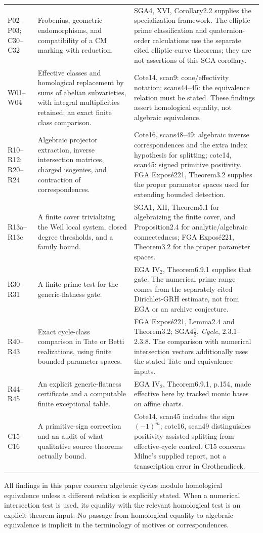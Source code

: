 \begin{longtable}{@{}p{}p{}p{}@{}}
P02--P03; C30--C32 & Frobenius, geometric endomorphisms, and compatibility of a CM marking with reduction. & SGA4, XVI, Corollary2.2 supplies the specialization framework. The elliptic prime classification and quaternion-order calculations use the separate cited elliptic-curve theorems; they are not assertions of this SGA corollary.\\[4pt]
W01--W04 & Effective classes and homological replacement by sums of abelian subvarieties, with integral multiplicities retained; an exact finite class comparison. & Cote14, scan9: cone/effectivity notation; scans44--45: the equivalence relation must be stated. These findings assert homological equality, not algebraic equivalence.\\[4pt]
R10--R12; R20--R24 & Algebraic projector extraction, inverse intersection matrices, charged isogenies, and contraction of correspondences. & Cote16, scans48--49: algebraic inverse correspondences and the extra index hypothesis for splitting; cote14, scan45: signed primitive positivity. FGA Expos\'e221, Theorem3.2 supplies the proper parameter spaces used for extending bounded detection.\\[4pt]
R13a--R13c & A finite cover trivializing the Weil local system, closed degree thresholds, and a family bound. & SGA1, XII, Theorem5.1 for algebraizing the finite cover, and Proposition2.4 for analytic/algebraic connectedness; FGA Expos\'e221, Theorem3.2 for the proper parameter spaces.\\[4pt]
R30--R31 & A finite-prime test for the generic-flatness gate. & EGA IV$_2$, Theorem6.9.1 supplies that gate. The numerical prime range comes from the separately cited Dirichlet-GRH estimate, not from EGA or an archive conjecture.\\[4pt]
R40--R43 & Exact cycle-class comparison in Tate or Betti realizations, using finite bounded parameter spaces. & FGA Expos\'e221, Lemma2.4 and Theorem3.2; SGA$4\frac12$, \emph{Cycle}, 2.3.1--2.3.8. The comparison with numerical intersection vectors additionally uses the stated Tate and equivalence inputs.\\[4pt]
R44--R45 & An explicit generic-flatness certificate and a computable finite exceptional table. & EGA IV$_2$, Theorem6.9.1, p.154, made effective here by tracked monic bases on affine charts.\\[4pt]
C15--C16 & A primitive-sign correction and an audit of what qualitative source theorems actually bound. & Cote14, scan45 includes the sign $(-1)^m$; cote16, scan49 distinguishes positivity-assisted splitting from effective-cycle control. C15 concerns Milne's supplied report, not a transcription error in Grothendieck.\\
\bottomrule
\end{longtable}
\normalsize

All findings in this paper concern algebraic cycles modulo homological
equivalence unless a different relation is explicitly stated. When a
numerical intersection test is used, its equality with the relevant
homological test is an explicit theorem input. No passage from
homological equality to algebraic equivalence is implicit in the
terminology of motives or correspondences.

